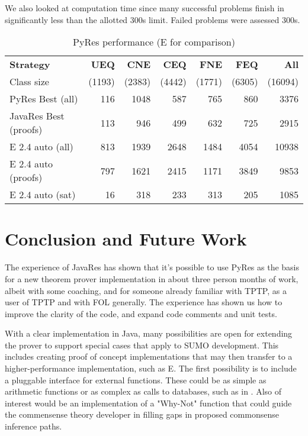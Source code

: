 \documentclass{llncs}
\begin{document}
We also looked at computation time since many successful problems finish in significantly less than the allotted
300s limit.  Failed problems were assessed 300s.

\begin{table}[tbh]
  \begin{tabular}{lrrrrrr}
    \hline
    \textbf{Strategy} & \multicolumn{1}{p{4em}}{\hfill{}\textbf{UEQ}}
    & \multicolumn{1}{p{4em}}{\hfill{}\textbf{CNE}}& \multicolumn{1}{p{4em}}{\hfill{}\textbf{CEQ}}
    & \multicolumn{1}{p{4em}}{\hfill{}\textbf{FNE}}& \multicolumn{1}{p{4em}}{\hfill{}\textbf{FEQ}}
    & \multicolumn{1}{p{4em}}{\hfill{}\textbf{All}}\\
    {\tiny Class size}                            & {\tiny (1193)} & {\tiny (2383)} & {\tiny (4442)} & {\tiny (1771)} & {\tiny (6305)} & {\tiny (16094)}\\
    \hline
    PyRes Best (all)                                    &   116 &  1048 &   587 &   765 &   860 &  3376 \\
    JavaRes Best (proofs)                                 &   113 &   946 &   499 &   632 &   725 &  2915 \\
    \hline
    E 2.4 auto (all)                              &   813 &  1939 &  2648 &  1484 &  4054 & 10938 \\
    E 2.4 auto (proofs)                           &   797 &  1621 &  2415 &  1171 &  3849 &  9853 \\
    E 2.4 auto (sat)                              &    16 &   318 &   233 &   313 &   205 &  1085 \\
    \hline
  \end{tabular}
  \caption{PyRes performance (E for comparison)}
  \label{tab:res}
\end{table}

\section{Conclusion and Future Work}

The experience of JavaRes has shown that it's possible to use PyRes as the basis for a new theorem
prover implementation in about three person months of work, albeit with some coaching, and for
someone already familiar with TPTP, as a user of TPTP and with FOL generally.  The
experience has shown us how to improve the clarity of the code, and expand code comments and unit
tests.

With a clear implementation in Java, many possibilities are open for extending the prover to support
special cases that apply to SUMO development.  This includes creating proof of concept implementations
that may then transfer to a higher-performance implementation, such as E.  The first possibility is to
include a pluggable interface for external functions.  These could be as simple as arithmetic functions
or as complex as calls to databases, such as in \cite{DBLP:conf/ki/SudaSWLM09}.  Also of interest would be an implementation
of a "Why-Not" function \cite{10.5555/1650083.1650093} that could guide the commensense theory developer in filling gaps
in proposed commonsense inference paths.


\end{document}
